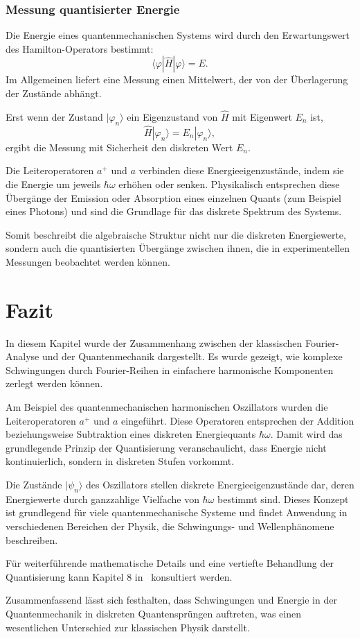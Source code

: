 		\subsubsection{Messung quantisierter Energie\label{fourier:subsubsection:MessungQuantisierterEnergie}}
			Die Energie eines quantenmechanischen Systems wird durch den Erwartungswert des Hamilton-Operators bestimmt:
			\[
				\langle \varphi | \hat{H} | \varphi \rangle = E.
			\]
			Im Allgemeinen liefert eine Messung einen Mittelwert, der von der Überlagerung der Zustände abhängt.

			Erst wenn der Zustand $|\varphi_n\rangle$ ein Eigenzustand von $\hat{H}$ mit Eigenwert $E_n$ ist,
			\[
				\hat{H}|\varphi_n\rangle = E_n |\varphi_n\rangle,
			\]
			ergibt die Messung mit Sicherheit den diskreten Wert $E_n$.

			Die Leiteroperatoren $a^+$ und $a$ verbinden diese Energieeigenzustände, indem sie die Energie um jeweils $\hbar\omega$ erhöhen oder senken. 
			Physikalisch entsprechen diese Übergänge der Emission oder Absorption eines einzelnen Quants (zum Beispiel eines Photons) und sind die Grundlage für das diskrete Spektrum des Systems.

			Somit beschreibt die algebraische Struktur nicht nur die diskreten Energiewerte, sondern auch die quantisierten Übergänge zwischen ihnen, die in experimentellen Messungen beobachtet werden können.

\section{Fazit\label{fourier:section:fazit}}
	In diesem Kapitel wurde der Zusammenhang zwischen der klassischen Fourier-Analyse und der Quantenmechanik dargestellt.
	Es wurde gezeigt, wie komplexe Schwingungen durch Fourier-Reihen in einfachere harmonische Komponenten zerlegt werden können.

	Am Beispiel des quantenmechanischen harmonischen Oszillators wurden die Leiteroperatoren $a^+$ und $a$ eingeführt.
	Diese Operatoren entsprechen der Addition beziehungsweise Subtraktion eines diskreten Energiequants $\hbar \omega$.
	Damit wird das grundlegende Prinzip der Quantisierung veranschaulicht, dass Energie nicht kontinuierlich, sondern in diskreten Stufen vorkommt.

	Die Zustände $|\psi_n\rangle$ des Oszillators stellen diskrete Energieeigenzustände dar, deren Energiewerte durch ganzzahlige Vielfache von $\hbar \omega$ bestimmt sind.
	Dieses Konzept ist grundlegend für viele quantenmechanische Systeme und findet Anwendung in verschiedenen Bereichen der Physik, die Schwingungs- und Wellenphänomene beschreiben.

	Für weiterführende mathematische Details und eine vertiefte Behandlung der Quantisierung kann Kapitel 8 in~\cite{fourier:quantenmechanik} konsultiert werden.

	Zusammenfassend lässt sich festhalten, dass Schwingungen und Energie in der Quantenmechanik in diskreten Quantensprüngen auftreten, was einen wesentlichen Unterschied zur klassischen Physik darstellt.
